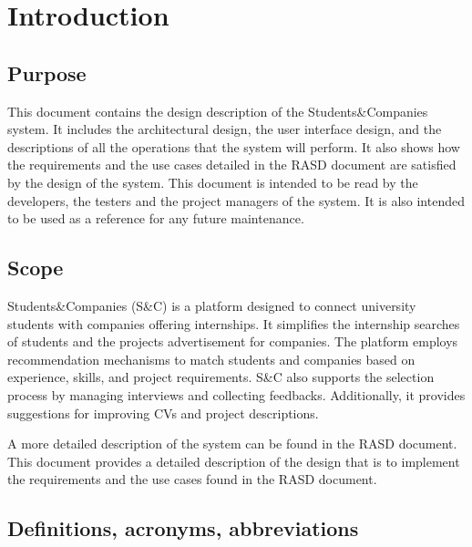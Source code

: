 \chapter{Introduction}

\section{Purpose}

This document contains the design description of the Students\&Companies system.
It includes the architectural design, the user interface design, and the descriptions of all the operations that the system will perform.
It also shows how the requirements and the use cases detailed in the RASD document are satisfied by the design of the system.
This document is intended to be read by the developers, the testers and the project managers of the system.
It is also intended to be used as a reference for any future maintenance.

\section{Scope}

Students\&Companies (S\&C) is a platform designed to connect university students with companies offering internships. 
It simplifies the internship searches of students and the projects advertisement for companies.
The platform employs recommendation mechanisms to match students and companies based on experience, skills, and project requirements. 
S\&C also supports the selection process by managing interviews and collecting feedbacks. 
Additionally, it provides suggestions for improving CVs and project descriptions.

A more detailed description of the system can be found in the RASD document.
This document provides a detailed description of the design that is to implement the requirements and the use cases found in the RASD document.

\section{Definitions, acronyms, abbreviations}

